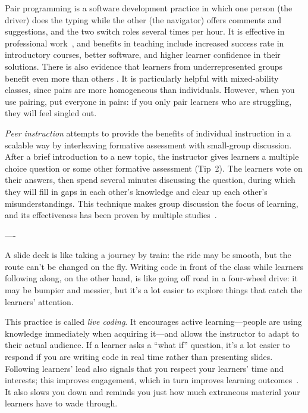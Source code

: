 
Pair programming is a software development practice
in which one person (the driver) does the typing
while the other (the navigator) offers comments and suggestions,
and the two switch roles several times per hour.
It is effective in professional work~\cite{Hann2009},
and benefits in teaching include increased success rate in introductory courses,
better software,
and higher learner confidence in their solutions.
There is also evidence that learners from underrepresented groups
benefit even more than others \cite{McDo2006,Hank2011,Cele2018}.
It is particularly helpful with mixed-ability classes,
since pairs are more homogeneous than individuals.
However,
when you use pairing,
put everyone in pairs:
if you only pair learners who are struggling,
they will feel singled out.

\emph{Peer instruction} attempts to provide the benefits of individual instruction in a scalable way
by interleaving formative assessment with small-group discussion.
After a brief introduction to a new topic,
the instructor gives learners a multiple choice question or some other formative assessment
(Tip~2).
The learners vote on their answers,
then spend several minutes discussing the question,
during which they will fill in gaps in each other's knowledge
and clear up each other's misunderstandings.
This technique makes group discussion the focus of learning,
and its effectiveness has been proven by multiple studies~\cite{Crou2001,Smit2009,Port2016}.

----


A slide deck is like taking a journey by train:
the ride may be smooth,
but the route can't be changed on the fly.
Writing code in front of the class while learners following along,
on the other hand,
is like going off road in a four-wheel drive:
it may be bumpier and messier,
but it's a lot easier to explore things that catch the learners' attention.

This practice is called \emph{live coding}.
It encourages active learning---people are using knowledge immediately
when acquiring it---and allows the instructor to adapt to their actual audience.
If a learner asks a ``what if'' question,
it's a lot easier to respond if you are writing code in real time
rather than presenting slides.
Following learners' lead also signals that you respect your learners' time and interests;
this improves engagement,
which in turn improves learning outcomes~\cite{Wlod2017}.
It also slows you down
and reminds you just how much extraneous material your learners have to wade through.

